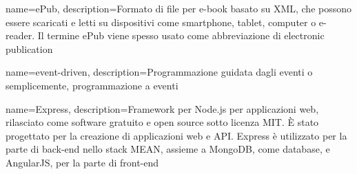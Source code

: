 \hypertarget{E}{}

{
	name=ePub,
	description={Formato di file per e-book basato su XML, che possono essere scaricati e letti su dispositivi come smartphone, tablet, computer o e-reader. Il termine ePub viene spesso usato come abbreviazione di electronic publication}
}

{
	name=event-driven,
	description={Programmazione guidata dagli eventi o semplicemente, programmazione a eventi}
}

{
	name=Express,
	description={Framework per Node.js per applicazioni web, rilasciato come software gratuito e open source sotto licenza MIT. È stato progettato per la creazione di applicazioni web e API. Express è utilizzato per la parte di back-end nello stack MEAN, assieme a MongoDB, come database, e AngularJS, per la parte di front-end}
}